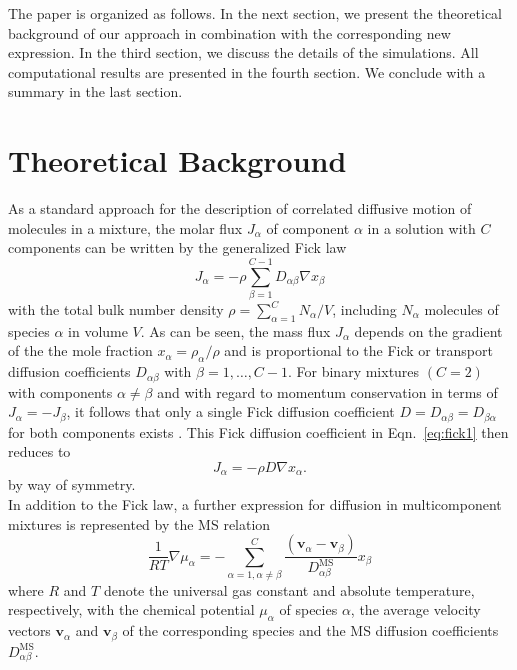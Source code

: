\documentclass[aip,jcp,reprint]{revtex4-1}
\begin{document}
The paper is organized as follows. In the next section, we present the theoretical background of our approach in combination with the corresponding new expression. In the third section, we discuss  the details of the
simulations. All computational results are  presented in the fourth section.
We conclude with a summary in the last section.

\section{Theoretical Background}
As a standard approach for  the description  of correlated diffusive motion of molecules in a mixture, the molar flux $J_{\alpha}$ of component $\alpha$ in a solution with $C$ components can be written by the generalized Fick law \cite{liu13a,bird04a}
\begin{equation}
	\label{eq:fick1}
	J_{\alpha}=- \rho \sum_{\beta=1}^{C-1} D_{\alpha\beta} \nabla x_{\beta}
\end{equation}
with the total bulk number density $\rho=\sum_{\alpha=1}^CN_{\alpha}/V$, including $N_{\alpha}$ molecules of species $\alpha$ in volume $V$. As can be seen, the mass flux $J_{\alpha}$ depends on the gradient of the the mole fraction $x_{\alpha}=\rho_{\alpha}/\rho$ and is proportional to the Fick or transport diffusion coefficients $D_{\alpha\beta}$ with $\beta=1,\ldots,C-1$.
For binary mixtures $(C=2)$ with components $\alpha\neq \beta$ and with regard to momentum conservation in terms of  $J_{\alpha} = - J_{\beta}$,  it follows that only a single Fick diffusion coefficient $D=D_{\alpha\beta}=D_{\beta\alpha}$ for both components exists \cite{liu13a,taylor93a,newman12a}. This Fick diffusion coefficient in Eqn.~\eqref{eq:fick1} then reduces to
\begin{equation}
	\label{eq:fickbin}
	J_{\alpha}= -\rho D \nabla x_{\alpha}.
\end{equation}
by way of symmetry.\\
In addition to the Fick law, a further expression for diffusion in multicomponent mixtures \cite{liu13a} is  represented by the
MS relation \cite{liu13a,bird04a}
\begin{equation}
	\label{eq:msd}
	\frac{1}{RT}\nabla\mu_{\alpha} = -\sum_{\alpha=1,\alpha\neq \beta}^{C}\frac{(\mathbf{v}_{\alpha}-\mathbf{v}_{\beta})}{D_{\alpha\beta}^{\text{MS}}}x_{\beta}
\end{equation}
where $R$ and $T$ denote the universal gas constant and absolute temperature, respectively, with the chemical potential $\mu_{\alpha}$ of species $\alpha$, the average velocity vectors $\mathbf{v}_{\alpha}$ and $\mathbf{v}_{\beta}$ of the corresponding species and the MS diffusion coefficients $D_{\alpha\beta}^{\text{MS}}$.
\end{document}
